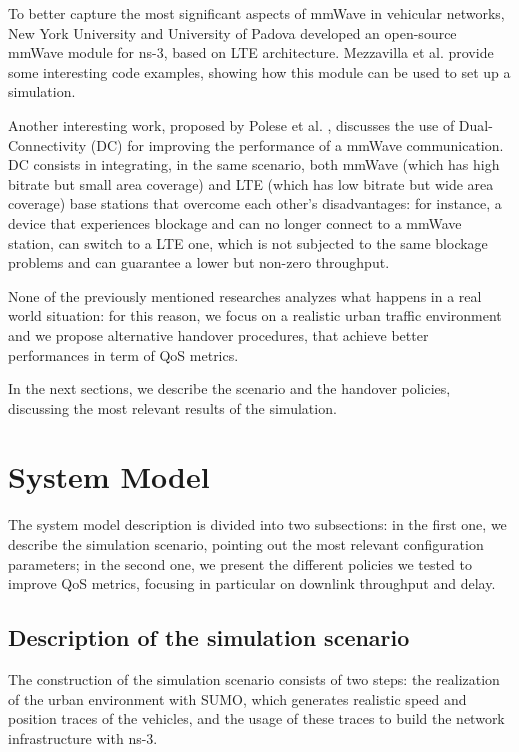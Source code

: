 \documentclass[conference,10pt]{IEEEtran}
\begin{document}
To better capture the most significant aspects of mmWave in vehicular networks, New York University and University of Padova developed an open-source mmWave module for ns-3, based on LTE architecture. Mezzavilla et al. \cite{e2esim} provide some interesting code examples, showing how this module can be used to set up a simulation.

Another interesting work, proposed by Polese et al. \cite{imphand}, discusses the use of Dual-Connectivity (DC) for improving the performance of a mmWave communication. DC consists in integrating, in the same scenario, both mmWave (which has high bitrate but small area coverage) and LTE (which has low bitrate but wide area coverage) base stations that overcome each other's disadvantages: for instance, a device that experiences blockage and can no longer connect to a mmWave station, can switch to a LTE one, which is not subjected to the same blockage problems and can guarantee a lower but non-zero throughput.

None of the previously mentioned researches analyzes what happens in a real world situation: for this reason, we focus on a realistic urban traffic environment and we propose alternative handover procedures, that achieve better performances in term of QoS metrics.

In the next sections, we describe the scenario and the handover policies, discussing the most relevant results of the simulation.


\section{System Model}\label{sec:symo}
The system model description is divided into two subsections: in the first one, we describe the simulation scenario, pointing out the most relevant configuration parameters; in the second one, we present the different policies we tested to improve QoS metrics, focusing in particular on downlink throughput and delay.


\subsection{Description of the simulation scenario}

The construction of the simulation scenario consists of two steps: the realization of the urban environment with SUMO, which generates realistic speed and position traces of the vehicles, and the usage of these traces to build the network infrastructure with ns-3.
\end{document}
